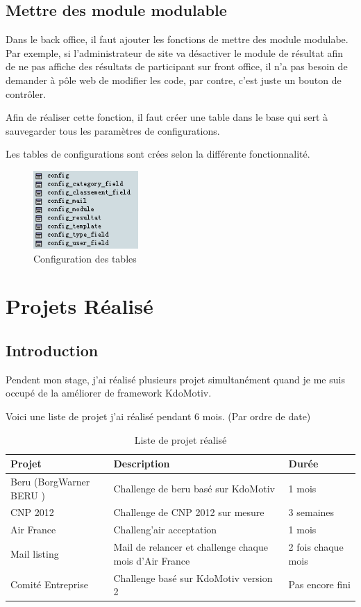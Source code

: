 \subsection{Mettre des module modulable}
Dans le back office, il faut ajouter les fonctions de mettre des module modulabe. Par exemple, si l'administrateur de site va désactiver le module de résultat afin de ne pas affiche des résultats de participant sur front office, il n'a pas besoin de demander à pôle web de modifier les code, par contre, c'est juste un bouton de contrôler. 

Afin de réaliser cette fonction, il faut créer une table dans le base qui sert à sauvegarder tous les paramètres de configurations.  

Les tables de configurations sont crées selon la différente fonctionnalité. 
\begin{figure}[hbtp]
\center
\includegraphics[width=4cm]{body/images/config.png}
\caption{Configuration des tables}
\end{figure}



 
	
\newpage
\section{Projets Réalisé}
\subsection{Introduction}
Pendent mon stage,  j'ai réalisé plusieurs projet simultanément quand je me suis occupé de la améliorer de framework KdoMotiv.

Voici une liste de projet j'ai réalisé pendant 6 mois. (Par ordre de date)

\begin{table}[htbp]
\centering
\renewcommand{\tabularxcolumn}[1]{>{\arraybackslash}m{#1}}
\begin{tabularx}{\textwidth}{lXl}
  \toprule
  Projet & Description  & Durée  \\
  \midrule
	 Beru (BorgWarner BERU )& Challenge de beru basé sur KdoMotiv & 1 mois \\ 	 
	 \hline	 
	 CNP 2012 & Challenge de CNP 2012 sur mesure & 3 semaines \\ 	 
	 \hline
	 Air France & Challeng'air acceptation & 1 mois \\ 
	 \hline
	 Mail listing & Mail de relancer et challenge chaque mois d'Air France & 2 fois chaque mois\\
	 \hline
	 Comité Entreprise & Challenge basé sur KdoMotiv version 2 & Pas encore fini \\
  \bottomrule
\end{tabularx}
 \caption{Liste de projet réalisé }
\end{table}

